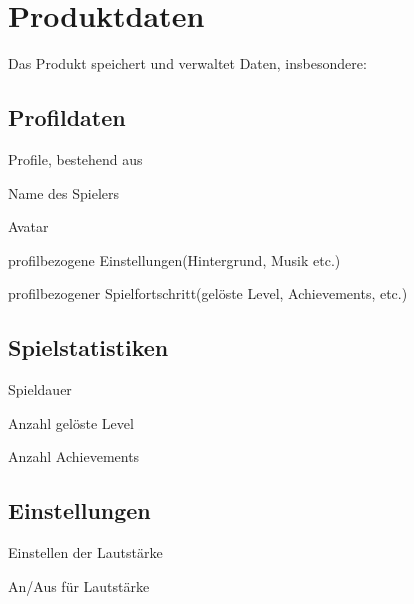 \documentclass{scrartcl}
\begin{document}
\clearpage









\section{Produktdaten}
Das Produkt speichert und verwaltet Daten, insbesondere: 

\subsection{Profildaten}

\begin{pdlist}
    \item \label{produktdaten:profile} Profile, bestehend aus 
    \begin{pdlist}
        \item \label{produktdaten:profile:name}Name des Spielers
        \item \label{produktdaten:profile:avatar}Avatar
        \item \label{produktdaten:profile:einstellungen}profilbezogene Einstellungen(Hintergrund, Musik etc.) 
        \item \label{produktdaten:profile:spielfortschritt}profilbezogener Spielfortschritt(gelöste Level, Achievements, etc.)
    \end{pdlist}
\end{pdlist}

\subsection{Spielstatistiken}
\label{produktdaten:spielestatistiken}

\begin{pdlist}[resume]
    \item Spieldauer
    \item Anzahl gelöste Level
    \item Anzahl Achievements
\end{pdlist}

\subsection{Einstellungen}
\label{produktdaten:einstellungen}

\begin{pdlist}[resume]
	\item Einstellen der Lautstärke
	\item An/Aus für Lautstärke
\end{pdlist}
\end{document}
